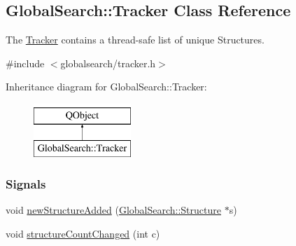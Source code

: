 \hypertarget{classGlobalSearch_1_1Tracker}{}\subsection{Global\+Search\+:\+:Tracker Class Reference}
\label{classGlobalSearch_1_1Tracker}


The \hyperlink{classGlobalSearch_1_1Tracker}{Tracker} contains a thread-\/safe list of unique Structures.  




{\ttfamily \#include $<$globalsearch/tracker.\+h$>$}

Inheritance diagram for Global\+Search\+:\+:Tracker\+:\begin{figure}[H]
\begin{center}
\leavevmode
\includegraphics[height=2.000000cm]{classGlobalSearch_1_1Tracker}
\end{center}
\end{figure}
\subsubsection*{Signals}
\begin{DoxyCompactItemize}
\item 
void \hyperlink{classGlobalSearch_1_1Tracker_ab52b21fb3c4af98fe959bb904f6d029d}{new\+Structure\+Added} (\hyperlink{classGlobalSearch_1_1Structure}{Global\+Search\+::\+Structure} $\ast$s)
\item 
void \hyperlink{classGlobalSearch_1_1Tracker_aa678a5cf9b95b57c51ae19dd6a116613}{structure\+Count\+Changed} (int c)
\end{DoxyCompactItemize}
